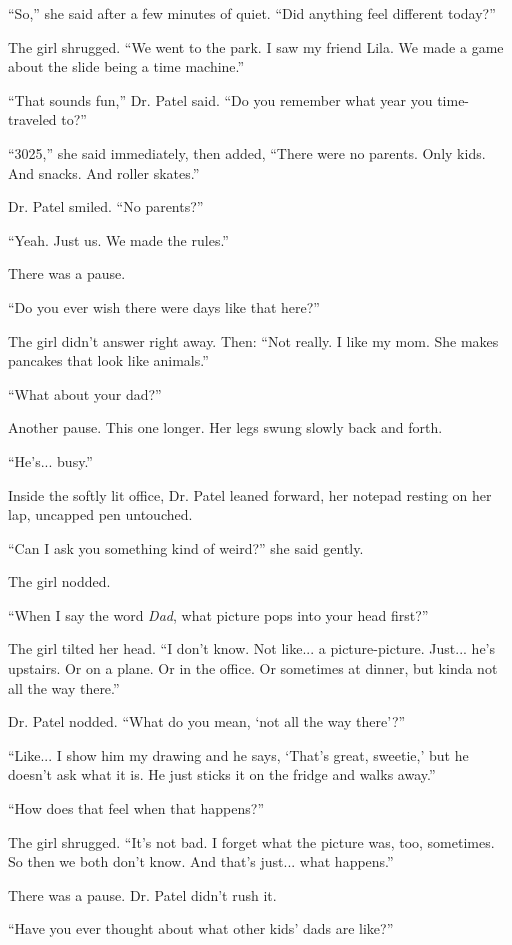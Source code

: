 ``So,'' she said after a few minutes of quiet. ``Did anything feel different today?''

The girl shrugged. ``We went to the park. I saw my friend Lila. We made a game about the slide being a time machine.''

``That sounds fun,'' Dr. Patel said. ``Do you remember what year you time-traveled to?''

``3025,'' she said immediately, then added, ``There were no parents. Only kids. And snacks. And roller skates.''

Dr. Patel smiled. ``No parents?''

``Yeah. Just us. We made the rules.''

There was a pause.

``Do you ever wish there were days like that here?''

The girl didn’t answer right away. Then: ``Not really. I like my mom. She makes pancakes that look like animals.''

``What about your dad?''

Another pause. This one longer. Her legs swung slowly back and forth.

``He’s... busy.''

Inside the softly lit office, Dr. Patel leaned forward, her notepad resting on her lap, uncapped pen untouched.

``Can I ask you something kind of weird?'' she said gently.

The girl nodded.

``When I say the word \textit{Dad}, what picture pops into your head first?''

The girl tilted her head. ``I don’t know. Not like... a picture-picture. Just... he’s upstairs. Or on a plane. Or in the office. Or sometimes at dinner, but kinda not all the way there.''

Dr. Patel nodded. ``What do you mean, ‘not all the way there’?''

``Like... I show him my drawing and he says, ‘That’s great, sweetie,’ but he doesn’t ask what it is. He just sticks it on the fridge and walks away.''

``How does that feel when that happens?''

The girl shrugged. ``It’s not bad. I forget what the picture was, too, sometimes. So then we both don’t know. And that’s just... what happens.''

There was a pause. Dr. Patel didn’t rush it.

``Have you ever thought about what other kids’ dads are like?''

